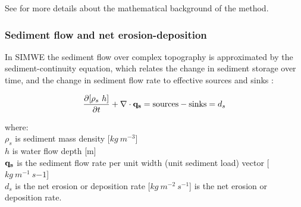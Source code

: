 \documentclass[gmd, manuscript]{copernicus}
\begin{document}
See \citep{Mitasova2005} for more details about the mathematical background of the method.


\subsubsection{Sediment flow and net erosion-deposition}

In SIMWE the sediment flow over complex topography is approximated 
by the sediment-continuity equation,
which relates the change in sediment storage over time, and the change
in sediment flow rate to effective sources and sinks \citep{haan1994,govindar1991,foster1972}: 

\begin{equation}
\label{eq:sedcont}
{\partial [\rho_s~h] \over \partial t} +
\nabla\cdot {\bf q_s} = {\rm sources - sinks}=
d_s
\end{equation}
\noindent

{\small
\noindent
where: \\
\noindent
\hspace*{0.5em} $\rho_s$ is sediment mass density [$\unit{kg~m^{-3}}$]\\
\hspace*{0.5em} $h$ is water flow depth  [\unit{m}]\\
\hspace*{0.5em} ${\bf q_s}$ is the sediment flow rate per unit width (unit sediment load) vector [$\unit{kg~m^{-1}~s{-1}}$]\\
\hspace*{0.5em} $d_s$ is the net erosion or deposition rate [$\unit{kg~m^{-2}~s^{-1}}$] is the net erosion or deposition rate.
}

%
\end{document}
